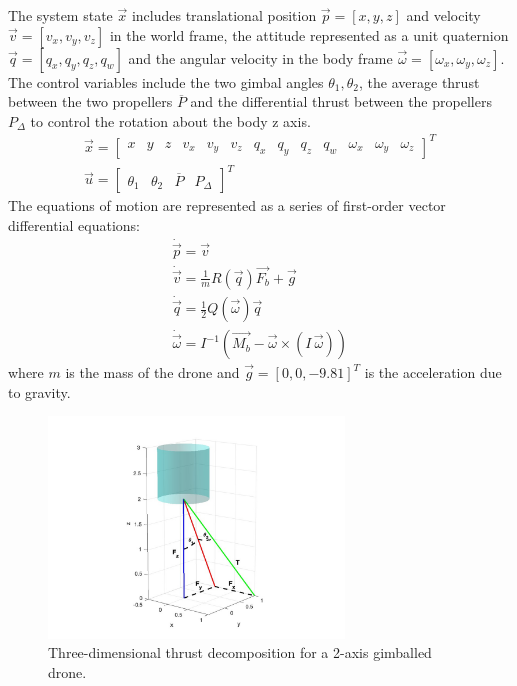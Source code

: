 \documentclass[]{article}
\newcommand{\pdiff}{P_{\Delta}}
\newcommand{\pavg}{\overline{P}}
\begin{document}
The system state $\vec{x}$ includes translational position $\vec{p} = [x, y,  z]$ and velocity $\vec{v} = [v_x, v_y, v_z ]$  in the world frame, the attitude represented as a unit quaternion $\vec{q} = [q_x, q_y,  q_z, q_w]$ and the angular velocity in the body frame $ \vec{\omega} = [\omega_x, \omega_y, \omega_z]$. The control variables include the two gimbal angles $\theta_1, \theta_2 $, the average thrust between the two propellers $\pavg$ and the differential thrust between the propellers $\pdiff$ to control the rotation about the body z axis.
\begin{gather*}
	\vec{x} =
	\begin{bmatrix}
		x & y & z & v_x & v_y & v_z & q_x & q_y & q_z & q_w & \omega_x & \omega_y & \omega_z
	\end{bmatrix}^T \\
	        \vec{u} =
	        \begin{bmatrix}
		        \theta_1 & \theta_2 & \pavg & \pdiff
		        \end{bmatrix}^T
\end{gather*}
The equations of motion are represented as a series of first-order vector differential equations:
\begin{gather}
        	\dot{\vec{p}}  = \vec{v}         \label{eqMotion1}	\\
        	\dot{\vec{v}}  = \frac{1}{m}R(\vec{q})\vec{F_b}+\vec{g}  \label{eqMotion2} \\
        	\dot{\vec{q}} = \frac{1}{2}Q(\vec{\omega})\vec{q}  \label{eqMotion3} \\
        	\dot{\vec{\omega}} = I^{-1}\!\left(\vec{M_b} - \vec{\omega} \times (I\,\vec{\omega})\right) \label{eqMotion4}
\end{gather}
where $m$ is the mass of the drone and $\vec{g} = [0, 0, -9.81]^T$ is the acceleration due to gravity.
\begin{figure}[H]
	\centering
	\includegraphics[width=0.7\textwidth]{graph3d.jpg}
	\caption{Three-dimensional thrust decomposition for a 2-axis gimballed drone.}
	\label{fig:3dgraph}
\end{figure}
\end{document}
